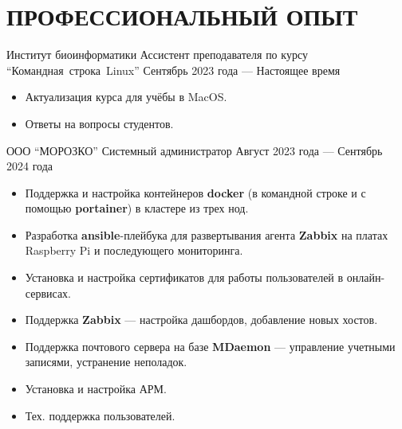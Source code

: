 \section{ПРОФЕССИОНАЛЬНЫЙ ОПЫТ}

\job
    {Институт биоинформатики}
    {Ассистент преподавателя по курсу “\mbox{Командная}~строка~Linux”}
    {Сентябрь 2023 года — Настоящее время}

    \begin{itemize}
      \setlength\itemsep{-.5em}
    \item Актуализация курса для учёбы в MacOS.
    \item Ответы на вопросы студентов.
    \end{itemize}

    \vspace{-0.5em}
    
    \job
        {ООО ``МОРОЗКО''}
        {Системный администратор}
        {Август 2023 года --- Сентябрь 2024 года}

        \begin{itemize}
          \setlength\itemsep{-.5em}
        \item Поддержка и настройка контейнеров \textbf{docker} (в командной строке и с помощью \textbf{portainer}) в кластере из трех нод.
        \item Разработка \textbf{ansible}-плейбука для развертывания
          агента \textbf{Zabbix} на платах Raspberry Pi и последующего
          мониторинга.
        \item Установка и настройка сертификатов для работы пользователей в онлайн-сервисах.
        \item Поддержка \textbf{Zabbix} — настройка дашбордов, добавление новых хостов.
        \item Поддержка почтового сервера на базе \textbf{MDaemon} — управление учетными записями, устранение неполадок.
        \item Установка и настройка АРМ.
        \item Тех. поддержка пользователей.
        \end{itemize}
